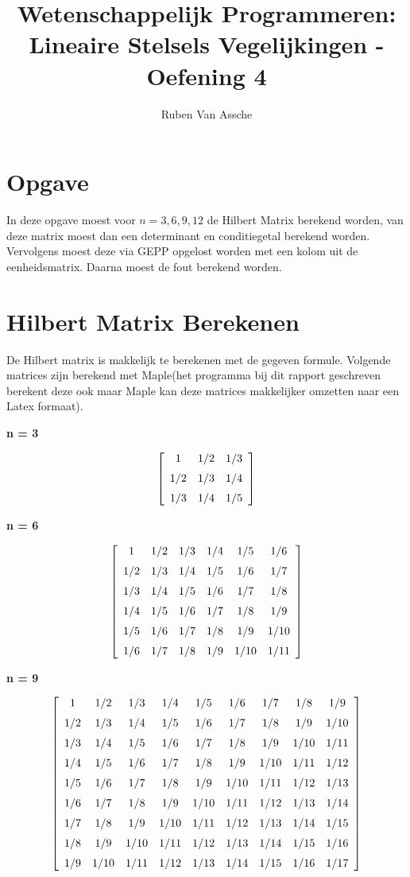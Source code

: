 \documentclass[10pt,a4paper]{article}
\author{Ruben Van Assche}
\title{Wetenschappelijk Programmeren: Lineaire Stelsels Vegelijkingen - Oefening 4}
\begin{document}
\maketitle
\section{Opgave}
In deze opgave moest voor $n = 3, 6, 9, 12$ de Hilbert Matrix berekend worden, van deze matrix moest dan een determinant en conditiegetal berekend worden. Vervolgens moest deze via GEPP opgelost worden met een kolom uit de eenheidsmatrix. Daarna moest de fout berekend worden.

\section{Hilbert Matrix Berekenen}
De Hilbert matrix is makkelijk te berekenen met de gegeven formule. Volgende matrices zijn berekend met Maple(het programma bij dit rapport geschreven berekent deze ook maar Maple kan deze matrices makkelijker omzetten naar een Latex formaat).
\begin{center}
\textbf{n = 3}
\end{center}
$$ \left[ \begin {array}{ccc} 1&1/2&1/3\\ \noalign{\medskip}1/2&1/3&1/4
\\ \noalign{\medskip}1/3&1/4&1/5\end {array} \right] $$
\begin{center}
\textbf{n = 6}
\end{center}
$$  \left[ \begin {array}{cccccc} 1&1/2&1/3&1/4&1/5&1/6
\\ \noalign{\medskip}1/2&1/3&1/4&1/5&1/6&1/7\\ \noalign{\medskip}1/3&1
/4&1/5&1/6&1/7&1/8\\ \noalign{\medskip}1/4&1/5&1/6&1/7&1/8&1/9
\\ \noalign{\medskip}1/5&1/6&1/7&1/8&1/9&1/10\\ \noalign{\medskip}1/6&
1/7&1/8&1/9&1/10&1/11\end {array} \right] $$
\begin{center}
\textbf{n = 9}
\end{center}
$$  \left[ \begin {array}{ccccccccc} 1&1/2&1/3&1/4&1/5&1/6&1/7&1/8&1/9
\\ \noalign{\medskip}1/2&1/3&1/4&1/5&1/6&1/7&1/8&1/9&1/10
\\ \noalign{\medskip}1/3&1/4&1/5&1/6&1/7&1/8&1/9&1/10&1/11
\\ \noalign{\medskip}1/4&1/5&1/6&1/7&1/8&1/9&1/10&1/11&1/12
\\ \noalign{\medskip}1/5&1/6&1/7&1/8&1/9&1/10&1/11&1/12&1/13
\\ \noalign{\medskip}1/6&1/7&1/8&1/9&1/10&1/11&1/12&1/13&1/14
\\ \noalign{\medskip}1/7&1/8&1/9&1/10&1/11&1/12&1/13&1/14&1/15
\\ \noalign{\medskip}1/8&1/9&1/10&1/11&1/12&1/13&1/14&1/15&1/16
\\ \noalign{\medskip}1/9&1/10&1/11&1/12&1/13&1/14&1/15&1/16&1/17
\end {array} \right] 
 $$
\end{document}
